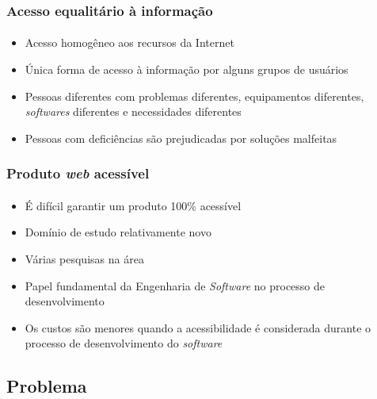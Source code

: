 \documentclass{beamer}
\begin{document}
\begin{frame}
\frametitle{Acesso equalitário à informação}
\framesubtitle{}

\begin{itemize}
  \item Acesso homogêneo aos recursos da Internet \citep{5260918}
  \item Única forma de acesso à informação por alguns grupos de usuários
  \item Pessoas diferentes com problemas diferentes, equipamentos diferentes, \textit{softwares} diferentes e necessidades diferentes
  \item Pessoas com deficiências são prejudicadas por soluções malfeitas
\end{itemize}

\end{frame}

\begin{frame}
\frametitle{Produto \textit{web} acessível}
\framesubtitle{}

\begin{itemize}
  \item É difícil garantir um produto 100\% acessível
  \item Domínio de estudo relativamente novo
  \item Várias pesquisas na área \citep{lazar:04,brajnik:06,zeng:05}
  \item Papel fundamental da Engenharia de \textit{Software} no processo de desenvolvimento
  \item Os custos são menores quando a acessibilidade é considerada durante o processo de desenvolvimento
do \textit{software} \citep{groves:11}
\end{itemize}

\end{frame}

\subsection[Problema]{Problema}
\end{document}

